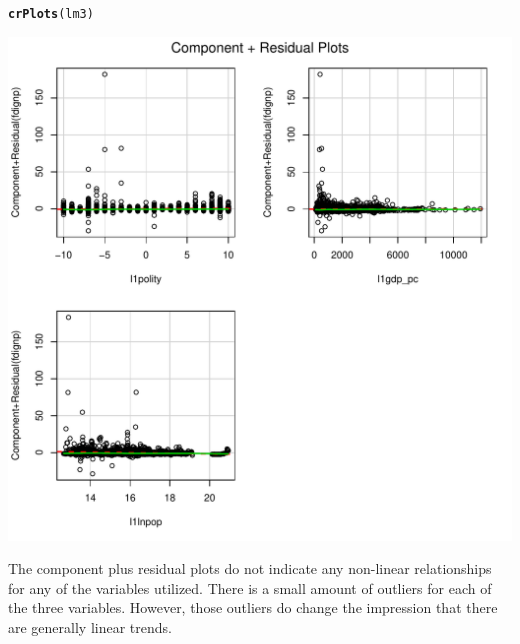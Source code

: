 \documentclass[12pt]{article}\usepackage[]{graphicx}\usepackage[]{color}
\makeatletter
\def\maxwidth{ %
  \ifdim\Gin@nat@width>\linewidth
    \linewidth
  \else
    \Gin@nat@width
  \fi
}
\newcommand{\hlstd}[1]{\textcolor[rgb]{0.345,0.345,0.345}{#1}}%
\newcommand{\hlkwd}[1]{\textcolor[rgb]{0.737,0.353,0.396}{\textbf{#1}}}%
\newenvironment{kframe}{%
 \def\at@end@of@kframe{}%
 \ifinner\ifhmode%
  \def\at@end@of@kframe{\end{minipage}}%
  \begin{minipage}{\columnwidth}%
 \fi\fi%
 \def\FrameCommand##1{\hskip\@totalleftmargin \hskip-\fboxsep
 \colorbox{shadecolor}{##1}\hskip-\fboxsep
     \hskip-\linewidth \hskip-\@totalleftmargin \hskip\columnwidth}%
 \MakeFramed {\advance\hsize-\width
   \@totalleftmargin\z@ \linewidth\hsize
   \@setminipage}}%
 {\par\unskip\endMakeFramed%
 \at@end@of@kframe}
\newenvironment{knitrout}{}{} %
\makeatother
\begin{document}
\begin{knitrout}
\begin{kframe}
{\ttfamily\noindent\itshape\color{messagecolor}{\#\# \\\#\# Attaching package: 'car'\\\#\# \\\#\# The following object is masked from 'package:boot':\\\#\# \\\#\#\ \ \ \  logit}}\begin{alltt}
\hlkwd{crPlots}\hlstd{(lm3)}
\end{alltt}
\end{kframe}
\includegraphics[width=\maxwidth]{figure/unnamed-chunk-5-1} 

\end{knitrout}

The component plus residual plots do not indicate any non-linear relationships for any of the variables utilized. There is a small amount of outliers for each of the three variables. However, those outliers do change the impression that there are generally linear trends.
\end{document}
